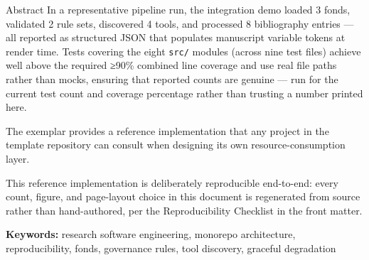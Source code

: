 \documentclass[
  ignorenonframetext,
]{beamer}
\begin{document}
\begin{frame}{Abstract}
In a representative pipeline run, the integration demo loaded 3 fonds,
validated 2 rule sets, discovered 4 tools, and processed 8 bibliography
entries --- all reported as structured JSON that populates manuscript
variable tokens at render time. Tests covering the eight \texttt{src/}
modules (across nine test files) achieve well above the required ≥90\%
combined line coverage and use real file paths rather than mocks,
ensuring that reported counts are genuine --- run
 for the current test
count and coverage percentage rather than trusting a number printed
here.

The  exemplar provides a reference
implementation that any project in the template repository can consult
when designing its own resource-consumption layer.

This reference implementation is deliberately reproducible end-to-end:
every count, figure, and page-layout choice in this document is
regenerated from source rather than hand-authored, per the
Reproducibility Checklist in the front matter.

\textbf{Keywords:} research software engineering, monorepo architecture,
reproducibility, fonds, governance rules, tool discovery, graceful
degradation
\end{frame}
\end{document}

